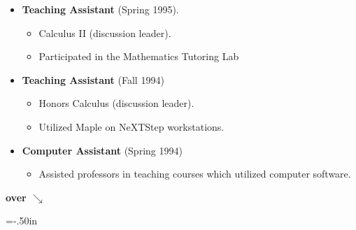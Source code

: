\begin{itemize}
\item \vspace{-0.099in} {\bf Teaching Assistant} (Spring 1995).
\begin{itemize}
\vspace{-0.099in}
\item  Calculus II (discussion leader). 
\vspace{-0.077in}
\item Participated in the Mathematics Tutoring Lab 
\end{itemize}
\item \vspace{-0.099in} {\bf Teaching Assistant}  (Fall 1994) 
\begin{itemize}
\vspace{-0.099in}
\item Honors Calculus (discussion leader).
\vspace{-0.077in}
\item  Utilized Maple on NeXTStep workstations. 
\end{itemize}
\item \vspace{-0.099in} {\bf Computer Assistant} (Spring 1994)
\begin{itemize}
\vspace{-0.099in}
\item Assisted professors in teaching courses which utilized computer software. 
\end{itemize}
\end{itemize}

\hfill  {\bf over $\searrow$}

\newpage
\voffset=-.50in

 

